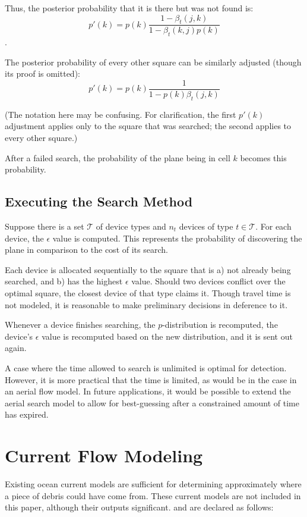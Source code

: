 \documentclass[a4paper]{article}
\begin{document}
Thus, the posterior probability that it is there but was not found is: $$p'(k)=p(k)\frac{1-\beta_t(j,k)}{1-\beta_t(k,j)p(k)}$$.

The posterior probability of every other square can be similarly adjusted (though its proof is omitted): $$p'(k)=p(k)\frac{1}{1-p(k)\beta_t(j,k)}$$

(The notation here may be confusing. For clarification, the first $p'(k)$ adjustment applies only to the square that was searched; the second applies to every other square.)

After a failed search, the probability of the plane being in cell $k$ becomes this probability.

\subsection{Executing the Search Method}

Suppose there is a set $\mathcal{T}$ of device types and $n_t$ devices of type $t\in\mathcal{T}$. For each device, the $\epsilon$ value is computed. This represents the probability of discovering the plane in comparison to the cost of its search.

Each device is allocated sequentially to the square that is a) not already being searched, and b) has the highest $\epsilon$ value. Should two devices conflict over the optimal square, the closest device of that type claims it. Though travel time is not modeled, it is reasonable to make preliminary decisions in deference to it.

Whenever a device finishes searching, the $p$-distribution is recomputed, the device's $\epsilon$ value is recomputed based on the new distribution, and it is sent out again. 

A case where the time allowed to search is unlimited is optimal for detection. However, it is more practical that the time is limited, as would be in the case in an aerial flow model. In future applications, it would be possible to extend the aerial search model to allow for best-guessing after a constrained amount of time has expired.



\section{Current Flow Modeling}

Existing ocean current models are sufficient for determining approximately where a piece of debris could have come from. These current models are not included in this paper, although their outputs significant. and are declared as follows:
\end{document}
